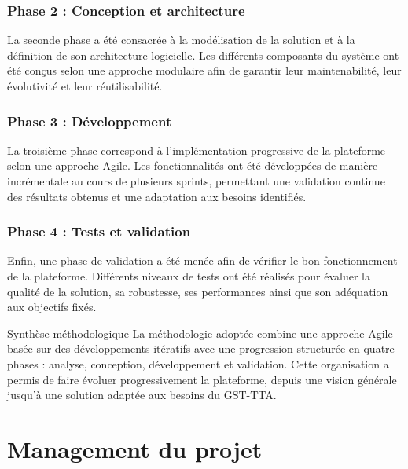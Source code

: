\subsubsection{Phase 2 : Conception et architecture}

La seconde phase a été consacrée à la modélisation de la solution et à la définition de son architecture logicielle. Les différents composants du système ont été conçus selon une approche modulaire afin de garantir leur maintenabilité, leur évolutivité et leur réutilisabilité.

\subsubsection{Phase 3 : Développement}

La troisième phase correspond à l'implémentation progressive de la plateforme selon une approche Agile. Les fonctionnalités ont été développées de manière incrémentale au cours de plusieurs sprints, permettant une validation continue des résultats obtenus et une adaptation aux besoins identifiés.

\subsubsection{Phase 4 : Tests et validation}

Enfin, une phase de validation a été menée afin de vérifier le bon fonctionnement de la plateforme. Différents niveaux de tests ont été réalisés pour évaluer la qualité de la solution, sa robustesse, ses performances ainsi que son adéquation aux objectifs fixés.

\begin{resultbox}{Synthèse méthodologique}
La méthodologie adoptée combine une approche Agile basée sur des développements itératifs avec une progression structurée en quatre phases : analyse, conception, développement et validation. Cette organisation a permis de faire évoluer progressivement la plateforme, depuis une vision générale jusqu'à une solution adaptée aux besoins du GST-TTA.
\end{resultbox}

\section{Management du projet}

